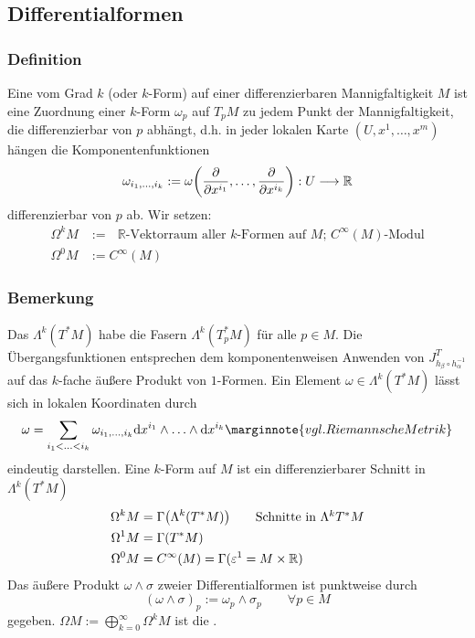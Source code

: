 \subsection{Differentialformen} %
\label{sub:52}
\subsubsection[Definition: Differentialform]{Definition} %
\label{ssub:521}
Eine  vom Grad $k$ (oder $k$-Form) auf einer differenzierbaren Mannigfaltigkeit $M$ ist eine Zuordnung einer $k$-Form $\omega_p$ auf $T_p M$ zu 
jedem Punkt der Mannigfaltigkeit, die differenzierbar von $p$ abhängt, d.h. in jeder lokalen Karte $(U, x^1, \ldots , x^m)$ hängen die Komponentenfunktionen
\[
	\omega_{i_1, \ldots , i_k} := \omega \enbrace*{\diff{}{x^{i_1}}, \ldots , \diff{}{x^{i_k}}} : U \longrightarrow \mathds{R} 
\]
differenzierbar von $p$ ab. Wir setzen:
\begin{align*}
	\Omega^k M &:= \text{ $\mathds{R}$-Vektorraum aller $k$-Formen auf $M$; $C^\infty(M)$-Modul} \\
	\Omega^0 M &:= C^\infty(M)
\end{align*}

\subsubsection{Bemerkung} %
\label{ssub:522}
Das  $\Lambda^k(T^* M)$ habe die Fasern $\Lambda^k(T^*_p M)$ für alle $p \in M$. Die Übergangsfunktionen entsprechen dem komponentenweisen Anwenden von 
$J^T_{h_\beta \circ h_\alpha ^{-1}}$ auf das $k$-fache äußere Produkt von $1$-Formen. Ein Element $\omega \in \Lambda^k(T^* M)$ lässt sich in lokalen Koordinaten durch
\[
	\omega = \sum_{i_1 < \ldots < i_k} \omega_{i_1, \ldots , i_k} \mathrm{d}x^{i_1} \wedge \ldots \wedge \mathrm{d}x^{i_k} \marginnote{vgl. Riemannsche Metrik}
\]
eindeutig darstellen. Eine $k$-Form auf $M$ ist ein differenzierbarer Schnitt in $\Lambda^k(T^* M)$
\begin{align*}
	\Omega^k M &= \Gamma \enbrace*{\Lambda^k(T^* M)} \tag*{Schnitte in $\Lambda^k T^* M$} \\
	\Omega^1 M &= \Gamma (T^* M) \\
	\Omega^0 M &= C^\infty(M) = \Gamma (\varepsilon^1 = M \times \mathds{R})
\end{align*}
Das äußere Produkt $\omega \wedge \sigma$ zweier Differentialformen ist punktweise durch
\[
	(\omega \wedge \sigma)_p := \omega_p \wedge \sigma_p \qquad \forall p \in M
\]
gegeben. $\Omega M := \bigoplus_{k=0}^\infty \Omega^k M$ ist die . 

